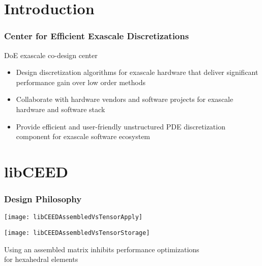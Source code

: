 \documentclass{beamer}
\begin{document}
\section{Introduction}

\begin{frame}
\begin{center}
\frametitle{Center for Efficient Exascale Discretizations}

\begin{flushleft}
DoE exascale co-design center
\end{flushleft}

\begin{itemize}

\item Design discretization algorithms for exascale hardware that deliver significant performance gain over low order methods

\item Collaborate with hardware vendors and software projects for exascale hardware and software stack

\item Provide efficient and user-friendly unstructured PDE discretization component for exascale software ecosystem

\end{itemize}

\end{center}
\end{frame}

\section{libCEED}

\begin{frame}
\begin{center}
\frametitle{Design Philosophy}

\begin{multicols}{2}

\begin{flushright}
\texttt{[image: libCEEDAssembledVsTensorApply]}
\end{flushright}

\begin{flushleft}
\texttt{[image: libCEEDAssembledVsTensorStorage]}
\end{flushleft}

\end{multicols}

Using an assembled matrix inhibits performance optimizations\\
for hexahedral elements

\end{center}
\end{frame}
\end{document}
